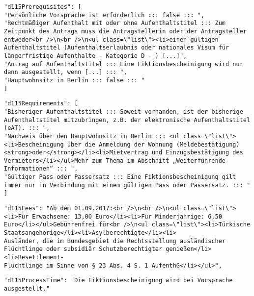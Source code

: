 \begin{verbatim}
"d115Prerequisites": [
"Persönliche Vorsprache ist erforderlich ::: false ::: ",
"Rechtmäßiger Aufenthalt mit oder ohne Aufenthaltstitel ::: Zum Zeitpunkt des Antrags muss die Antragstellerin oder der Antragsteller entweder<br />\n<br />\n<ul class=\"list\"><li>einen gültigen Aufenthaltstitel (Aufenthaltserlaubnis oder nationales Visum für längerfristige Aufenthalte - Kategorie D - ) [...]",
"Antrag auf Aufenthaltstitel ::: Eine Fiktionsbescheinigung wird nur dann ausgestellt, wenn [...] ::: ",
"Hauptwohnsitz in Berlin ::: false ::: "
]
\end{verbatim}

\begin{verbatim}
"d115Requirements": [
"Bisheriger Aufenthaltstitel ::: Soweit vorhanden, ist der bisherige Aufenthaltstitel mitzubringen, z.B. der elektronische Aufenthaltstitel (eAT). ::: ",
"Nachweis über den Hauptwohnsitz in Berlin ::: <ul class=\"list\"><li>Bescheinigung über die Anmeldung der Wohnung (Meldebestätigung) <strong>oder</strong></li><li>Mietvertrag und Einzugsbestätigung des Vermieters</li></ul>Mehr zum Thema im Abschnitt „Weiterführende Informationen“ ::: ",
"Gültiger Pass oder Passersatz ::: Eine Fiktionsbescheinigung gilt immer nur in Verbindung mit einem gültigen Pass oder Passersatz. ::: "
]
\end{verbatim}


\begin{verbatim}
"d115Fees": "Ab dem 01.09.2017:<br />\n<br />\n<ul class=\"list\"><li>Für Erwachsene: 13,00 Euro</li><li>Für Minderjährige: 6,50 Euro</li></ul>Gebührenfrei für<br />\n<ul class=\"list\"><li>Türkische Staatsangehörige</li><li>Asylberechtigte</li><li>
Ausländer, die im Bundesgebiet die Rechtsstellung ausländischer Flüchtlinge oder subsidiär Schutzberechtigter genießen</li><li>Resettlement-
Flüchtlinge im Sinne von § 23 Abs. 4 S. 1 AufenthG</li></ul>",
\end{verbatim}

\begin{verbatim}
"d115ProcessTime": "Die Fiktionsbescheinigung wird bei Vorsprache ausgestellt."
\end{verbatim}

